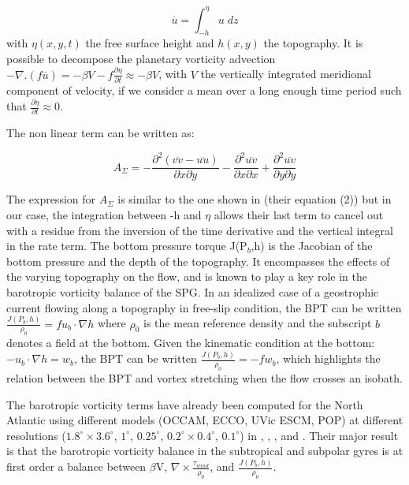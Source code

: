 \documentclass[os, manuscript]{copernicus}
\begin{document}
\begin{equation}
\overline{u}=\int^{\eta}_{-h} u \; dz
\end{equation}
with $\eta(x,y,t)$ the free surface height and $h(x,y)$ the topography. It is possible to decompose the planetary vorticity advection $-\nabla.(f\overline{u})=-\beta V-f \frac{\partial \eta}{\partial t}\approx - \beta V$, with $V$ the vertically integrated meridional component of velocity, if we consider a mean over a long enough time period such that $\frac{\partial \eta}{\partial t} \approx 0$.

The non linear term can be written as:

\begin{equation}
A_{\Sigma}= -\frac{\partial ^2 (\overline{vv}-\overline{uu})}{\partial x \partial y}-\frac{\partial ^2 \overline{uv}}{\partial x \partial x} +\frac{\partial ^2 \overline{uv}}{\partial y \partial y}
\end{equation}

The expression for $A_{\Sigma}$ is similar to the one shown in \citet{schoonover2016} (their equation (2)) but in our case, the integration between -h and $\eta$ allows their last term to cancel out with a residue from the inversion of the time derivative and the vertical integral in the rate term. The bottom pressure torque J(P$_b$,h) is the Jacobian of the bottom pressure and the depth of the topography. It encompasses the effects of the varying topography on the flow, and is known to play a key role in the barotropic vorticity balance of the SPG. In an idealized case of a geostrophic current flowing along a topography in free-slip condition, the BPT can be written $\frac{J(P_b,h)}{\rho _0}=f u_b \cdot \nabla h$ where $\rho_0$ is the mean reference density and the subscript $b$ denotes a field at the bottom. Given the kinematic condition at the bottom: $-u_b \cdot \nabla h =w_b$, the BPT can be written $\frac{J(P_b,h)}{\rho _0}=-fw_b$, which highlights the relation between the BPT and vortex stretching when the flow crosses an isobath.

The barotropic vorticity terms have already been computed for the North Atlantic using different models (OCCAM, ECCO, UVic ESCM, POP) at different resolutions ($1.8^{\circ}\times3.6^{\circ}$, $1^{\circ}$, $0.25^{\circ}$, $0.2^{\circ}\times 0.4^{\circ}$, $0.1^{\circ}$) in \citet{hughes2001}, \citet{spence2012}, \citet{sonnewald2019}, and \citet{yeager2015}. Their major result is that the barotropic vorticity balance in the subtropical and subpolar gyres is at first order a balance between $\beta$V, $\nabla \times \frac{\tau _{wind}}{\rho_{0}}$, and $\frac{J(P_b,h)}{\rho _0}$. 
\end{document}

